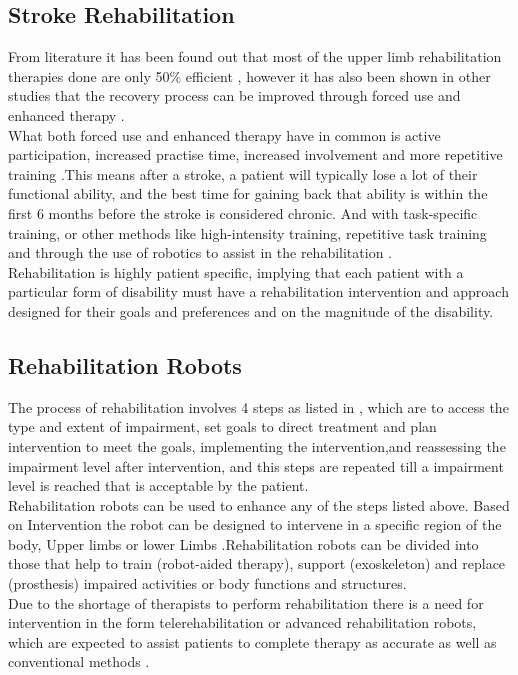 \subsection{Stroke Rehabilitation}
From literature it has been found out that most of the upper limb rehabilitation therapies done are only 50\% efficient \cite{Johnson2003}, however it has also been shown in other studies that the recovery process can be improved through forced use and enhanced therapy \cite{Duncan1997}.\\
What both forced use and enhanced therapy have in common is active participation, increased practise time, increased involvement and more repetitive training \cite{Johnson2003}.This means after a stroke, a patient will typically lose a lot of their functional ability, and the best time for gaining back that ability is within the first 6 months before the stroke is considered chronic. And with task-specific training, or other methods like high-intensity training, repetitive task training and through the use of robotics to assist in the rehabilitation \cite{Dobkin2004,Langhorne2011}.\\
Rehabilitation is highly patient specific, implying that each patient with a particular form of disability must have a rehabilitation intervention and approach designed for their goals and preferences and on the magnitude of the disability.

\subsection{Rehabilitation Robots}
The process of rehabilitation involves 4 steps as listed in \cite{Laut2016}, which are to access the type and extent of impairment, set goals to direct treatment and plan intervention to meet the goals, implementing the intervention,and reassessing the impairment level after intervention, and this steps are repeated till a impairment level is reached that is acceptable by the patient.\\
Rehabilitation robots can be used to enhance any of the steps listed above. Based on Intervention the robot can be designed to intervene in a specific region of the body, Upper limbs or lower Limbs \cite{Laut2016}.Rehabilitation robots can be divided into those that help to train (robot-aided therapy), support (exoskeleton) and replace (prosthesis) impaired activities or body functions and structures. \\
Due to the shortage of therapists to perform rehabilitation there is a need for intervention in the form telerehabilitation or advanced rehabilitation robots, which are expected to assist patients to complete therapy as accurate as well as conventional methods \cite{Sheng2016}.

